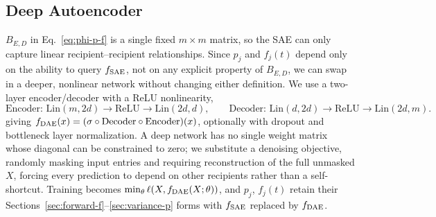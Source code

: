 \subsection{Deep Autoencoder}
\label{sec:deep-ae}

$B_{E,D}$ in Eq.~\eqref{eq:phi-p-f} is a single fixed $m\times m$ matrix,
so the SAE can only capture linear recipient--recipient relationships.
Since $p_j$ and $f_j(t)$ depend only on the ability to query $f_{\mathrm{SAE}}$, not on any explicit
property of $B_{E,D}$, we can swap in a deeper, nonlinear network without
changing either definition. We use a two-layer encoder/decoder with a ReLU
nonlinearity,
\begin{equation}
\label{eq:deep-ae}
\text{Encoder: Lin}(m,2d)\to\text{ReLU}\to\text{Lin}(2d,d),
\qquad
\text{Decoder: Lin}(d,2d)\to\text{ReLU}\to\text{Lin}(2d,m).
\end{equation}
giving $f_{\mathrm{DAE}}(x) = (\sigma\circ\text{Decoder}\circ\text{Encoder})(x)$,
optionally with dropout and bottleneck layer normalization. A deep network
has no single weight matrix whose diagonal can be constrained to zero; we
substitute a denoising objective, randomly masking input entries and
requiring reconstruction of the full unmasked $X$, forcing every prediction
to depend on other recipients rather than a self-shortcut. Training becomes
$\min_\theta \ell(X, f_{\mathrm{DAE}}(X;\theta))$, and $p_j$, $f_j(t)$ retain their
Sections~\ref{sec:forward-f}--\ref{sec:variance-p} forms with $f_{\mathrm{SAE}}$
replaced by $f_{\mathrm{DAE}}$.
